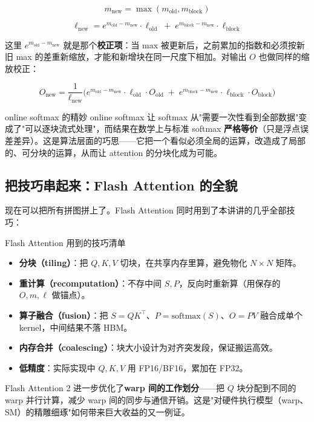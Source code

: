 \documentclass[a4paper]{article}
\begin{document}
\[
m_{\text{new}} = \max(m_{\text{old}}, m_{\text{block}})
\]

\[
\ell_{\text{new}} = e^{m_{\text{old}} - m_{\text{new}}} \cdot \ell_{\text{old}} \;+\; e^{m_{\text{block}} - m_{\text{new}}} \cdot \ell_{\text{block}}
\]

这里 $e^{m_{\text{old}} - m_{\text{new}}}$ 就是那个\textbf{校正项}：当 max 被更新后，之前累加的指数和必须按新旧 max 的差重新缩放，才能和新增块在同一尺度下相加。对输出 $O$ 也做同样的缩放校正：

\[
O_{\text{new}} = \frac{1}{\ell_{\text{new}}} \Big( e^{m_{\text{old}} - m_{\text{new}}} \cdot \ell_{\text{old}} \cdot O_{\text{old}} \;+\; e^{m_{\text{block}} - m_{\text{new}}} \cdot \ell_{\text{block}} \cdot O_{\text{block}} \Big)
\]

\begin{knowledgebox}{online softmax 的精妙}
online softmax 让 softmax 从"需要一次性看到全部数据"变成了"可以逐块流式处理"，而结果在数学上与标准 softmax \textbf{严格等价}（只是浮点误差差异）。这是算法层面的巧思——它把一个看似必须全局的运算，改造成了局部的、可分块的运算，从而让 attention 的分块化成为可能。
\end{knowledgebox}

\subsection{把技巧串起来：Flash Attention 的全貌}

现在可以把所有拼图拼上了。Flash Attention 同时用到了本讲讲的几乎全部技巧：

\begin{importantbox}{Flash Attention 用到的技巧清单}
\begin{itemize}
\item \textbf{分块（tiling）}：把 $Q, K, V$ 切块，在共享内存里算，避免物化 $N \times N$ 矩阵。
\item \textbf{重计算（recomputation）}：不存中间 $S, P$，反向时重新算（用保存的 $O, m, \ell$ 做锚点）。
\item \textbf{算子融合（fusion）}：把 $S=QK^\top$、$P=\text{softmax}(S)$、$O=PV$ 融合成单个 kernel，中间结果不落 HBM。
\item \textbf{内存合并（coalescing）}：块大小设计为对齐突发段，保证搬运高效。
\item \textbf{低精度}：实际实现中 $Q,K,V$ 用 FP16/BF16，累加在 FP32。
\end{itemize}
\end{importantbox}

Flash Attention 2 进一步优化了\textbf{warp 间的工作划分}——把 $Q$ 块分配到不同的 warp 并行计算，减少 warp 间的同步与通信开销。这是"对硬件执行模型（warp、SM）的精雕细琢"如何带来巨大收益的又一例证。
\end{document}
